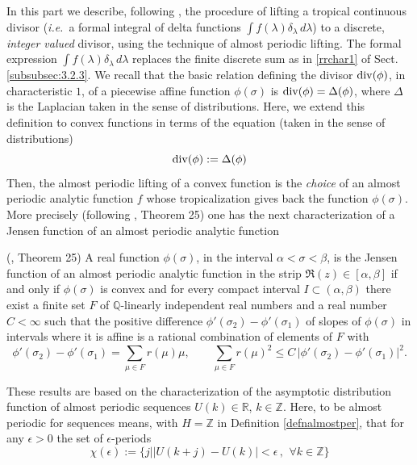 \documentclass[graybox, envcountsect%
]{svmult}
\def\Q{{\mathbb Q}}
\def\R{{\mathbb R}}
\def\Z{{\mathbb Z}}
\def\qqq{\,,\,~\forall}
\newcommand{\ie}{{\it i.e.\/}\ }
\begin{document}
In this part we describe, following \cite{JT}, the procedure of lifting a tropical continuous divisor (\ie a formal integral of delta functions $\int f(\lambda) \delta_\lambda\, d\lambda$) to a discrete, \emph{integer valued} divisor, using the technique of almost periodic lifting.\newline
 The formal expression $\int f(\lambda) \delta_\lambda\, d\lambda$ replaces the finite discrete sum as in \eqref{rrchar1} of Sect. \ref{subsubsec:3.2.3}. We recall that the basic relation defining the divisor ${\rm div}(\phi)$, in characteristic $1$, of a piecewise affine function $\phi(\sigma)$ is ${\rm div}(\phi)=\Delta(\phi)$, where $\Delta$ is the Laplacian taken in the sense of distributions. Here, we extend this definition to convex functions in terms of the equation (taken in the sense of distributions)
\begin{equation}\label{rrchar1bis}
{\rm div}(\phi):=\Delta(\phi)
\end{equation}
Then, the almost periodic lifting of a convex function is the {\em choice} of an almost periodic analytic function $f$ whose tropicalization gives back the function $\phi(\sigma)$. More precisely (following \cite{JT}, Theorem 25) one has the next characterization of a Jensen function of an almost periodic analytic function
\begin{theorem}\label{Jessen}  (\cite{JT}, Theorem 25) A real function $\phi(\sigma)$, in the interval $\alpha<\sigma<\beta$, is the Jensen function of an almost periodic analytic function in the strip $\Re(z)\in [\alpha,\beta]$ if and only if $\phi(\sigma)$ is convex and for every compact interval $I\subset (\alpha,\beta)$ there exist a finite set $F$ of $\Q$-linearly independent real numbers and a real number $C<\infty$ such that the positive difference  $\phi'(\sigma_2)-\phi'(\sigma_1)$ of slopes of $\phi(\sigma)$ in intervals where it is affine is a rational combination of elements of $F$ with 
$$
\phi'(\sigma_2)-\phi'(\sigma_1)=\sum_{\mu\in F} r(\mu) \mu, \qquad \sum_{\mu\in F} r(\mu)^2\leq C\, \vert\phi'(\sigma_2)-\phi'(\sigma_1)\vert^2.
$$
\end{theorem}
These results are based on the characterization of the asymptotic distribution function of almost periodic sequences $U(k)\in \R$, $k\in \Z$. Here, to be almost periodic for sequences means, with $H=\Z$ in Definition \ref{defnalmostper}, that for any $\epsilon>0$ the set of $\epsilon$-periods
$$
\chi(\epsilon):=\{ j\mid \vert U(k+j)-U(k)\vert<\epsilon \qqq k\in \Z\}
$$
\end{document}
